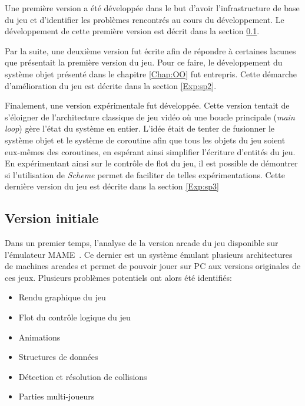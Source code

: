 \documentclass[12pt,twoside,letterpaper,francais]{book}
\newcommand{\Schemelang}{{\textit{Scheme }}}
\begin{document}
Une première version a été développée dans le but d'avoir
l'infrastructure de base du jeu et d'identifier les problèmes
rencontrés au cours du développement. Le développement de cette
première version est décrit dans la section \ref{Exp:sp1}.

Par la suite, une deuxième version fut écrite afin de répondre à
certaines lacunes que présentait la première version du jeu. Pour ce
faire, le développement du système objet présenté dans le chapitre
\ref{Chap:OO} fut entrepris. Cette démarche d'amélioration du jeu est
décrite dans la section \ref{Exp:sp2}.

Finalement, une version expérimentale fut développée. Cette version
tentait de s'éloigner de l'architecture classique de jeu vidéo où une
boucle principale (\textit{main loop}) gère l'état du système en
entier. L'idée était de tenter de fusionner le système objet et le
système de coroutine afin que tous les objets du jeu soient eux-mêmes
des coroutines, en espérant ainsi simplifier l'écriture d'entités du
jeu. En expérimentant ainsi sur le contrôle de flot du jeu, il est
possible de démontrer si l'utilisation de \Schemelang permet de faciliter
de telles expérimentations. Cette dernière version du jeu est décrite
dans la section \ref{Exp:sp3}


\FloatBarrier
\subsection{Version initiale} \label{Exp:sp1}
Dans un premier temps, l'analyse de la version arcade du jeu
disponible sur l'émulateur MAME~\cite{MAME}. Ce dernier est un système
émulant plusieurs architectures de machines arcades et permet de
pouvoir jouer sur PC aux versions originales de ces jeux. Plusieurs
problèmes potentiels ont alors été identifiés:

\begin{itemize}
\item Rendu graphique du jeu
\item Flot du contrôle logique du jeu
\item Animations
\item Structures de données
\item Détection et résolution de collisions
\item Parties multi-joueurs
\end{itemize}


\FloatBarrier
\end{document}
